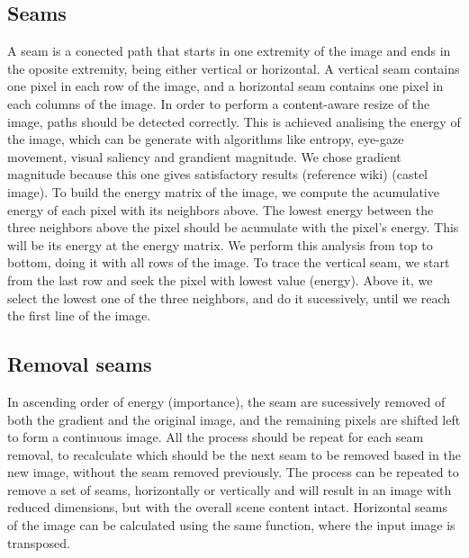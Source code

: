 \documentclass{article}
\begin{document}
	\subsection{Seams}
	A seam is a conected path that starts in one extremity of the image and ends in the oposite extremity, being either vertical or horizontal. A vertical seam contains one pixel in each row of the image, and a horizontal seam contains one pixel in each columns of the image. In order to perform a content-aware resize of the image, paths should be detected correctly. This is achieved analising the energy of the image, which can be generate with algorithms like entropy, eye-gaze movement, visual saliency and grandient magnitude. We chose gradient magnitude because this one gives satisfactory results (reference wiki) (castel image).
	To build the energy matrix of the image, we compute the acumulative energy of each pixel with its neighbors above. The lowest energy between the three neighbors above the pixel should be acumulate with the pixel's energy. This will be its energy at the energy matrix. We perform this analysis from top to bottom, doing it with all rows of the image. To trace the vertical seam, we start from the last row and seek the pixel with lowest value (energy). Above it, we select the lowest one of the three neighbors, and do it sucessively, until we reach the first line of the image.
	\subsection{Removal seams}
	In ascending order of energy (importance), the seam are sucessively removed of both the gradient and the original image, and the remaining pixels are shifted left to form a continuous image. All the process should be repeat for each seam removal, to recalculate which should be the next seam to be removed based in the new image, without the seam removed previously. The process can be repeated to remove a set of seams, horizontally or vertically and will result in an image with reduced dimensions, but with the overall scene content intact. Horizontal seams of the image can be calculated using the same function, where the input image is transposed.

{}

\end{document}
